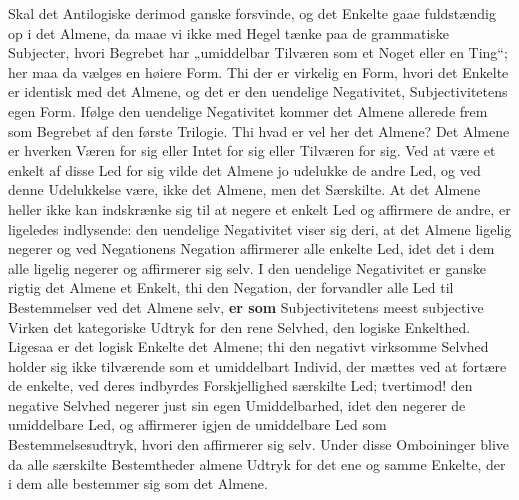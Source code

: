 \documentclass[11pt]{book}
\newcommand{\opage}[1]{\marginnote{\footnotesize\textit{[#1]}}}
\begin{document}
Skal det Antilogiske derimod ganske forsvinde, og det Enkelte gaae
fuldstændig op i det Almene, da maae vi ikke med Hegel tænke paa de
grammatiske Subjecter, hvori Begrebet har „umiddelbar Tilværen som et
Noget eller en Ting“; her maa da vælges en høiere Form. Thi der er
virkelig en Form, hvori det Enkelte er identisk med det Almene, og det
er den uendelige Negativitet, Subjectivitetens egen Form. Ifølge den
uendelige Negativitet kommer det Almene allerede frem som Begrebet af
den første Trilogie. Thi hvad er vel her det Almene? Det Almene er
hverken Væren for sig eller Intet for sig eller Tilværen for sig. Ved
at være et enkelt af disse Led for sig vilde det Almene jo udelukke de
andre Led, og ved denne Udelukkelse være, ikke det Almene, men det
Særskilte. At det Almene heller ikke kan indskrænke sig til at negere
et enkelt Led og affirmere de andre, er ligeledes indlysende: den
uendelige Negativitet viser sig deri, at det Almene ligelig negerer og
ved Negationens Negation affirmerer alle enkelte Led, idet det i dem
alle ligelig negerer og affirmerer sig selv. I den uendelige
Negativitet er ganske rigtig det Almene et Enkelt, thi den Negation,
der forvandler alle Led til Bestemmelser ved det Almene selv,
\textbf{er som} Subjectivitetens meest subjective Virken det
kategoriske Udtryk for den rene Selvhed, den logiske Enkelthed.
Ligesaa er det logisk Enkelte det Almene; thi den negativt virksomme
Selvhed holder sig ikke tilværende som et umiddelbart Individ, der
mættes ved at fortære de enkelte, ved deres indbyrdes Forskjellighed
særskilte Led; tvertimod! den negative Selvhed negerer just sin egen
Umiddelbarhed, idet den negerer de
\opage{155} \setcounter{footnote}{0}%
umiddelbare Led, og affirmerer igjen de umiddelbare Led som
Bestemmelsesudtryk, hvori den affirmerer sig selv. Under disse
Omboininger blive da alle særskilte Bestemtheder almene Udtryk for det
ene og samme Enkelte, der i dem alle bestemmer sig som det Almene.
\end{document}
